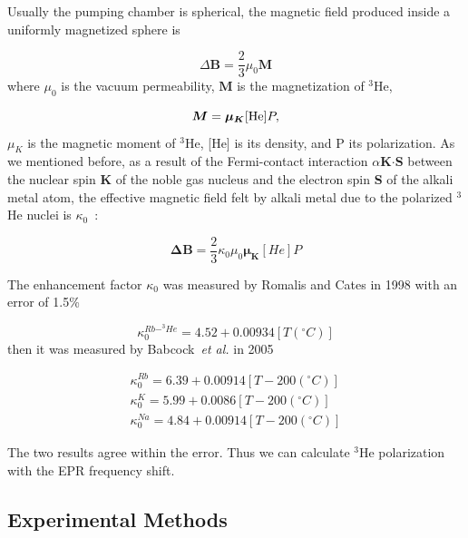 Usually the pumping chamber is spherical, the magnetic field produced inside a uniformly magnetized sphere is~\cite{Jackson}

\begin{equation}
\Delta \boldsymbol{B}=\frac{2}{3}\mu_{0}\boldsymbol{M}
\end{equation}
where $\mu_{0}$ is the vacuum permeability, $\boldsymbol{M}$ is the magnetization of $^{3}$He, 

\begin{equation}
\boldsymbol{M}=\boldsymbol{\mu_{K}}[{\rm He}]P,
\end{equation}
$\mu_{K}$ is the magnetic moment of $^{3}$He, [He] is its density, and P its polarization. As we mentioned before, as a result of the Fermi-contact interaction $\alpha${\bf K$\cdot$S} between the nuclear spin {\bf K} of the noble gas nucleus and the electron spin {\bf S} of the alkali metal atom, the effective magnetic field felt by alkali metal due to the polarized $^3$He nuclei is $\kappa_{0}$~\cite{PhysRevA.58.3004}:

\begin{equation}
\boldsymbol{\Delta B}=\frac{2}{3} \kappa_{0}\mu_{0}\boldsymbol{\mu_{K}}[He]P
\end{equation}

The enhancement factor $\kappa_{0}$ was measured by Romalis and Cates in 1998 with an error of 1.5\%~\cite{PhysRevA.58.3004}

\begin{equation}
\kappa_{0}^{Rb-^{3}He}=4.52+0.00934[T(^{\circ}C)]
\end{equation}
then it was measured by Babcock~\emph{et al.} in 2005~\cite{PhysRevA.71.013414}

\begin{subequations}
	\begin{gather}
	\kappa_{0}^{Rb}=6.39+0.00914[T-200(^{\circ}C)]\\
	\kappa_{0}^{K}=5.99+0.0086[T-200(^{\circ}C)]\\
	\kappa_{0}^{Na}=4.84+0.00914[T-200(^{\circ}C)]
	\end{gather}
\end{subequations}

The two results agree within the error. Thus we can calculate $^{3}$He polarization with the EPR frequency shift. 

\subsection{Experimental Methods}

